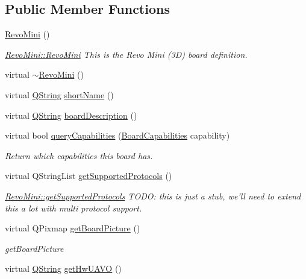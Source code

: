 \subsection*{\-Public \-Member \-Functions}
\begin{DoxyCompactItemize}
\item 
\hyperlink{group___boards___open_pilot_plugin_ga95d3e848c16c6f33a7d1acc14b2773da}{\-Revo\-Mini} ()
\begin{DoxyCompactList}\small\item\em \hyperlink{group___boards___open_pilot_plugin_ga95d3e848c16c6f33a7d1acc14b2773da}{\-Revo\-Mini\-::\-Revo\-Mini} \-This is the \-Revo \-Mini (3\-D) board definition. \end{DoxyCompactList}\item 
virtual \hyperlink{group___boards___open_pilot_plugin_ga6e4458ca98fbe0ed1501b324c934af47}{$\sim$\-Revo\-Mini} ()
\item 
virtual \hyperlink{group___u_a_v_objects_plugin_gab9d252f49c333c94a72f97ce3105a32d}{\-Q\-String} \hyperlink{group___boards___open_pilot_plugin_ga927253b30c15894799a8f99f632aec03}{short\-Name} ()
\item 
virtual \hyperlink{group___u_a_v_objects_plugin_gab9d252f49c333c94a72f97ce3105a32d}{\-Q\-String} \hyperlink{group___boards___open_pilot_plugin_ga721fb37ca43a4eaa930682025c96b24d}{board\-Description} ()
\item 
virtual bool \hyperlink{group___boards___open_pilot_plugin_ga5bf154e46cfe882c67dd2e851b4195c7}{query\-Capabilities} (\hyperlink{group___core_plugin_ga01b09218f2a13aaeee6db007ac6bd967}{\-Board\-Capabilities} capability)
\begin{DoxyCompactList}\small\item\em \-Return which capabilities this board has. \end{DoxyCompactList}\item 
virtual \-Q\-String\-List \hyperlink{group___boards___open_pilot_plugin_gaf820a526d814e3f0d11e403bc2c89f60}{get\-Supported\-Protocols} ()
\begin{DoxyCompactList}\small\item\em \hyperlink{group___boards___open_pilot_plugin_gaf820a526d814e3f0d11e403bc2c89f60}{\-Revo\-Mini\-::get\-Supported\-Protocols} \-T\-O\-D\-O\-: this is just a stub, we'll need to extend this a lot with multi protocol support. \end{DoxyCompactList}\item 
virtual \-Q\-Pixmap \hyperlink{group___boards___open_pilot_plugin_ga63ad5a29a4010dcb3e00f6e0383e741f}{get\-Board\-Picture} ()
\begin{DoxyCompactList}\small\item\em get\-Board\-Picture \end{DoxyCompactList}\item 
virtual \hyperlink{group___u_a_v_objects_plugin_gab9d252f49c333c94a72f97ce3105a32d}{\-Q\-String} \hyperlink{group___boards___open_pilot_plugin_gae959e2f2bea464d785957b6198a8c9c9}{get\-Hw\-U\-A\-V\-O} ()
\end{DoxyCompactItemize}


